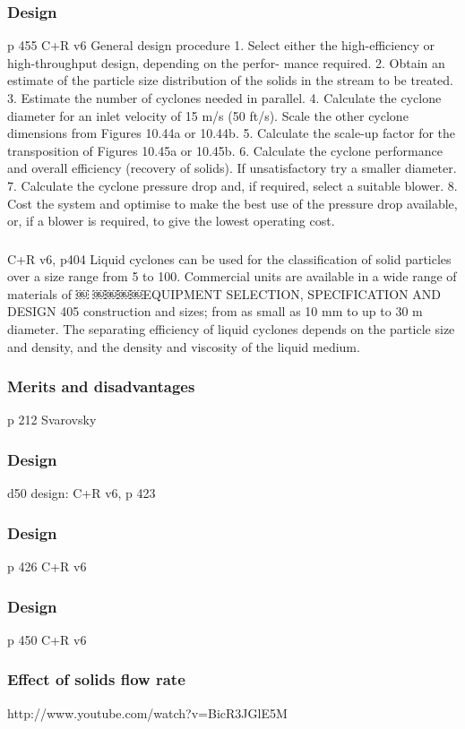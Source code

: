 \begin{frame}\frametitle{Design}
	p 455 C+R v6
	General design procedure
	1. Select either the high-efficiency or high-throughput design, depending on the perfor- mance required.
	2. Obtain an estimate of the particle size distribution of the solids in the stream to be treated.
	3. Estimate the number of cyclones needed in parallel.
	4. Calculate the cyclone diameter for an inlet velocity of 15 m/s (50 ft/s). Scale the
	other cyclone dimensions from Figures 10.44a or 10.44b.
	5. Calculate the scale-up factor for the transposition of Figures 10.45a or 10.45b.
	6. Calculate the cyclone performance and overall efficiency (recovery of solids). If
	unsatisfactory try a smaller diameter.
	7. Calculate the cyclone pressure drop and, if required, select a suitable blower.
	8. Cost the system and optimise to make the best use of the pressure drop available,
	or, if a blower is required, to give the lowest operating cost.
\end{frame}

\begin{frame}\frametitle{}
	C+R v6, p404
	Liquid cyclones can be used for the classification of solid particles over a size range from 5 to 100\micron. Commercial units are available in a wide range of materials of
	￼
	￼￼￼￼EQUIPMENT SELECTION, SPECIFICATION AND DESIGN 405
	construction and sizes; from as small as 10 mm to up to 30 m diameter. The separating efficiency of liquid cyclones depends on the particle size and density, and the density and viscosity of the liquid medium.
\end{frame}

\begin{frame}\frametitle{Merits and disadvantages}
	p 212 Svarovsky
\end{frame}

\begin{frame}\frametitle{Design}
	d50 design: C+R v6, p 423
\end{frame}

\begin{frame}\frametitle{Design}
	p 426 C+R v6
\end{frame}

\begin{frame}\frametitle{Design}
	p 450 C+R v6
\end{frame}

\begin{frame}\frametitle{Effect of solids flow rate}
	http://www.youtube.com/watch?v=BicR3JGlE5M
\end{frame}


